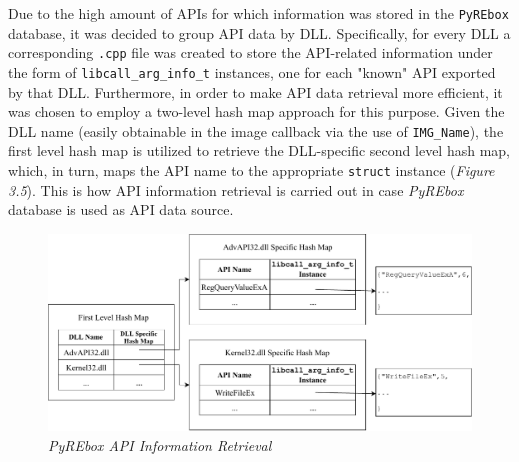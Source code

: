 Due to the high amount of APIs for which information was stored in the \texttt{PyREbox} database, it was decided to group API data by DLL. Specifically, for every DLL a corresponding \texttt{.cpp} file was created to store the API-related information under the form of \texttt{libcall\_arg\_info\_t} instances, one for each "known" API exported by that DLL. Furthermore, in order to make API data retrieval more efficient, it was chosen to employ a two-level hash map approach for this purpose. Given the DLL name (easily obtainable in the image callback via the use of \texttt{IMG\_Name}), the first level hash map is utilized to retrieve the DLL-specific second level hash map, which, in turn, maps the API name to the appropriate \texttt{struct} instance (\textit{Figure 3.5}). This is how API information retrieval is carried out in case \textit{PyREbox} database is used as API data source.
\\
\begin{figure}[h]
\centering
\includegraphics[width=1\textwidth]{Figures/HashMap.pdf}
\caption{\textit{PyREbox API Information Retrieval}}
\end{figure}

